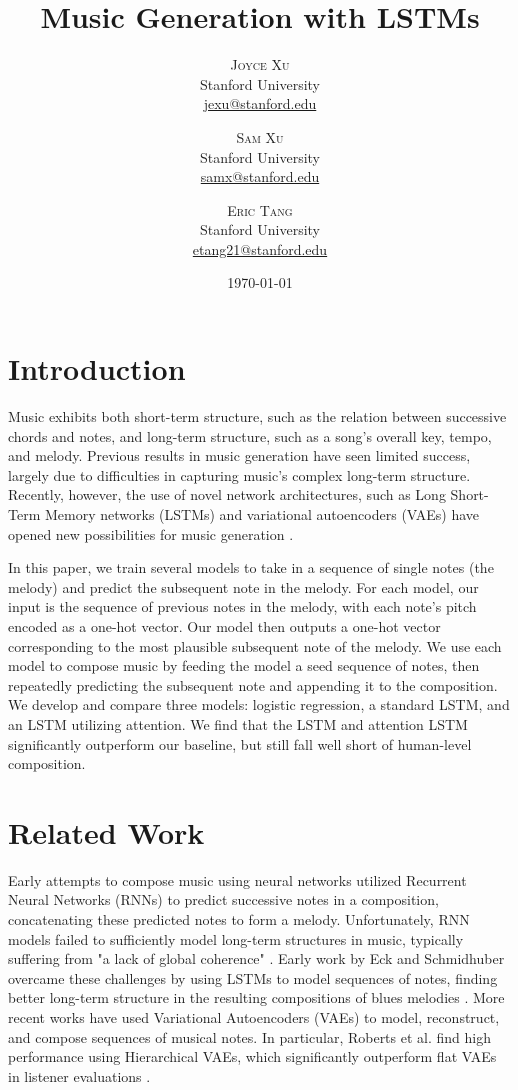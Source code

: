 \documentclass[twoside,twocolumn]{article}
\title{Music Generation with LSTMs} %
\author{%
\textsc{Joyce Xu} \\[1ex] %
\normalsize Stanford University \\ %
\normalsize \href{mailto:jexu@stanford.edu}{jexu@stanford.edu} %
\and %
\textsc{Sam Xu} \\[1ex] %
\normalsize Stanford University \\ %
\normalsize \href{mailto:samx}{samx@stanford.edu} %
\and %
\textsc{Eric Tang} \\[1ex] %
\normalsize Stanford University \\ %
\normalsize \href{mailto:etang21@stanford.edu}{etang21@stanford.edu} %
}
\date{\today} %
\begin{document}
\maketitle


\section{Introduction}

Music exhibits both short-term structure, such as the relation between successive chords and notes, and long-term structure, such as a song's overall key, tempo, and melody. Previous results in music generation have seen limited success, largely due to difficulties in capturing music's complex long-term structure. Recently, however, the use of novel network architectures, such as Long Short-Term Memory networks (LSTMs) and variational autoencoders (VAEs) have opened new possibilities for music generation \cite{lstm-vae}.

In this paper, we train several models to take in a sequence of single notes (the melody) and predict the subsequent note in the melody. For each model, our input is the sequence of previous notes in the melody, with each note's pitch encoded as a one-hot vector. Our model then outputs a one-hot vector corresponding to the most plausible subsequent note of the melody. We use each model to compose music by feeding the model a seed sequence of notes, then repeatedly predicting the subsequent note and appending it to the composition. We develop and compare three models: logistic regression, a standard LSTM, and an LSTM utilizing attention. We find that the LSTM and attention LSTM significantly outperform our baseline, but still fall well short of human-level composition.

\section{Related Work}
Early attempts to compose music using neural networks utilized Recurrent Neural Networks (RNNs) to predict successive notes in a composition, concatenating these predicted notes to form a melody. Unfortunately, RNN models failed to sufficiently model long-term structures in music, typically suffering from "a lack of global coherence" \cite{Mozer}. Early work by Eck and Schmidhuber overcame these challenges by using LSTMs to model sequences of notes, finding better long-term structure in the resulting compositions of blues melodies \cite{eck}. More recent works have used Variational Autoencoders (VAEs) to model, reconstruct, and compose sequences of musical notes. In particular, Roberts et al. find high performance using Hierarchical VAEs, which significantly outperform flat VAEs in listener evaluations \cite{lstm-vae}.
\end{document}
